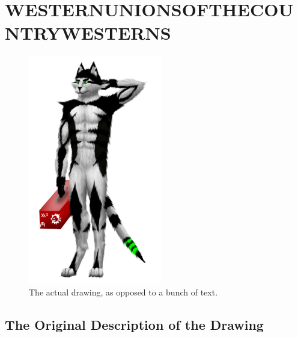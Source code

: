 \documentclass{report}
\newcommand\imageheight{10cm}
\begin{document}
\chapter{WESTERNUNIONSOFTHECOUNTRYWESTERNS}
\begin{figure}[ht]
	\centering
	\includegraphics[height=\imageheight]{50x/toolbox/westernunionsofthecountrywesterns.png}
\caption{The actual drawing, as opposed to a bunch of text.}
\end{figure}
\section{The Original Description of the Drawing}
\end{document}
